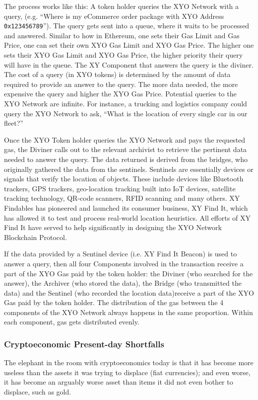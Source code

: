 \documentclass{article}
\begin{document}
The process works like this: A token holder queries the XYO Network with a query, (e.g. ``Where is my eCommerce order package with XYO Address \texttt{0x123456789}''). The query gets sent into a queue, where it waits to be processed and answered. Similar to how in Ethereum, one sets their Gas Limit and Gas Price, one can set their own XYO Gas Limit and XYO Gas Price. The higher one sets their XYO Gas Limit and XYO Gas Price, the higher priority their query will have in the queue. The XY Component that answers the query is the \Gls{diviner}. The cost of a query (in XYO tokens) is determined by the amount of data required to provide an answer to the query.  The more data needed, the more expensive the query and higher the XYO Gas Price. Potential queries to the XYO Network are infinite. For instance, a trucking and logistics company could query the XYO Network to ask, ``What is the location of every single car in our fleet?''

Once the XYO Token holder queries the XYO Network and pays the requested gas, the Diviner calls out to the relevant \Gls{archivist} to retrieve the pertinent data needed to answer the query. The data returned is derived from the \Glspl{bridge}, who originally gathered the data from the \Glspl{sentinel}. Sentinels are essentially devices or signals that verify the location of objects. These include devices like Bluetooth trackers, GPS trackers, geo-location tracking built into IoT devices, satellite tracking technology, QR-code scanners, RFID scanning and many others. XY Findables has pioneered and launched its consumer business, XY Find It, which has allowed it to test and process real-world location heuristics. All efforts of XY Find It have served to help significantly in designing the XYO Network Blockchain Protocol.

If the data provided by a Sentinel device (i.e. XY Find It Beacon) is used to answer a query, then all four Components involved in the transaction receive a part of the XYO Gas paid by the token holder: the Diviner (who searched for the answer), the Archiver (who stored the data), the Bridge (who transmitted the data) and the Sentinel (who recorded the location data)receive a part of the XYO Gas paid by the token holder. The distribution of the gas between the 4 components of the XYO Network always happens in the same proportion.  Within each component, gas gets distributed evenly.

\subsubsection{Cryptoeconomic Present-day Shortfalls}
The elephant in the room with cryptoeconomics today is that it has become more useless than the assets it was trying to displace (fiat currencies); and even worse, it has become an arguably worse asset than items it did not even bother to displace, such as gold.
\end{document}
